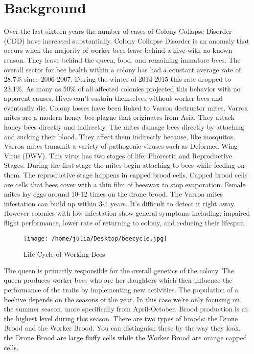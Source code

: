 \documentclass[final,5p,times,twocolumn,authoryear]{elsarticle}
\begin{document}
\section{Background}
\label{Background}

	Over the last sixteen years the number of cases of Colony Collapse Disorder (CDD) have increased substantially. Colony Collapse Disorder is an anomaly that occurs when the majority of worker bees leave behind a hive with no known reason. They leave behind the queen, food, and remaining immature bees. The overall sector for bee health within a colony has had a constant average rate of 28.7\% since 2006-2007. During the winter of 2014-2015 this rate dropped to 23.1\%. As many as 50\% of all affected colonies projected this behavior with no apparent causes. Hives can’t sustain themselves without worker bees and eventually die.  
        Colony losses have been linked to Varroa destructor mites. Varroa mites are a modern honey bee plague that originates from Asia. They attack honey bees directly and indirectly. The mites damage bees directly by attaching and sucking their blood. They affect them indirectly because, like mosquitos, Varroa mites transmit a variety of pathogenic viruses such as Deformed Wing Virus (DWV). This virus has two stages of life: Phorectic and Reproductive Stages. During the first stage the mites begin attaching to bees while feeding on them. The reproductive stage happens in capped brood cells. Capped brood cells are cells that bees cover with a thin film of beeswax to stop evaporation. Female mites lay eggs around 10-12 times on the drone brood. The Varroa mites infestation can build up within 3-4 years. It’s difficult to detect it right away. However colonies with low infestation show general symptoms including; impaired flight performance, lower rate of returning to colony, and reducing their lifespan.

\begin{figure}
  \centering
  \texttt{[image: /home/julia/Desktop/beecycle.jpg]}
  
  Life Cycle of Working Bees
\end{figure}
        
The queen is primarily responsible for the overall genetics of the colony. The queen produces worker bees who are her daughters which then influence the performance of the traits by implementing new activities. The population of a beehive depends on the seasons of the year. In this case we’re only focusing on the summer season, more specifically from April-October. Brood production is at the highest level during this season. There are two types of broods: the Drone Brood and the Worker Brood. You can distinguish these by the way they look, the Drone Brood are large fluffy cells while the Worker Brood are orange capped cells.
\end{document}
